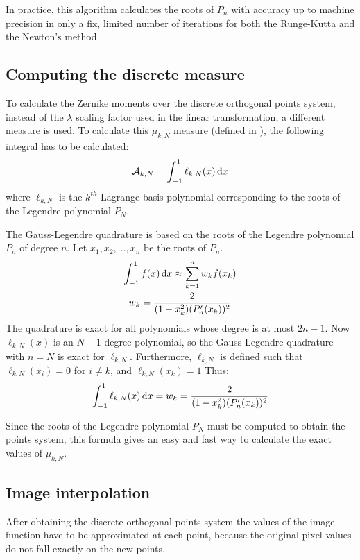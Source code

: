 In practice, this algorithm calculates the roots of $P_n$ with accuracy up to machine precision in only a fix, limited number of iterations for both the Runge-Kutta and the Newton's method.

\subsection{Computing the discrete measure}
To calculate the Zernike moments over the discrete orthogonal points system, instead of the $\lambda$ scaling factor used in the linear transformation, a different measure is used. To calculate this $\mu_{k,N}$ measure (defined in%
), the following integral has to be calculated:
\begin{gather*}
    \mathcal{A}_{k,N} = \int_{-1}^{1}\ell_{k,N}(x)\dif x
\end{gather*}
where $\ell_{k,N}$ is the $k^{th}$ Lagrange basis polynomial corresponding to the roots of the Legendre polynomial $P_N$.

The Gauss-Legendre quadrature is based on the roots of the Legendre polynomial $P_n$ of degree $n$. Let $x_1,x_2,\ldots,x_n$ be the roots of $P_n$.
\begin{gather*}
    \int_{-1}^{1}f(x)\dif x \approx \sum_{k=1}^n w_k f(x_k) \\
    w_k = \frac{2}{(1-x_k^2)(P_n'(x_k))^2}
\end{gather*}
The quadrature is exact for all polynomials whose degree is at most $2n-1$. Now $\ell_{k,N}(x)$ is an $N-1$ degree polynomial, so the Gauss-Legendre quadrature with $n=N$ is exact for $\ell_{k,N}$. Furthermore, $\ell_{k,N}$ is defined such that $\ell_{k,N}(x_i) = 0$ for $i \neq k$, and $\ell_{k,N}(x_k) = 1$ Thus:
\begin{gather*}
    \int_{-1}^{1}\ell_{k,N}(x)\dif x = w_k = \frac{2}{(1-x_k^2)(P_n'(x_k))^2}
\end{gather*}

Since the roots of the Legendre polynomial $P_N$ must be computed to obtain the points system, this formula gives an easy and fast way to calculate the exact values of $\mu_{k,N}$.

\subsection{Image interpolation}
After obtaining the discrete orthogonal points system the values of the image function have to be approximated at each point, because the original pixel values do not fall exactly on the new points.

